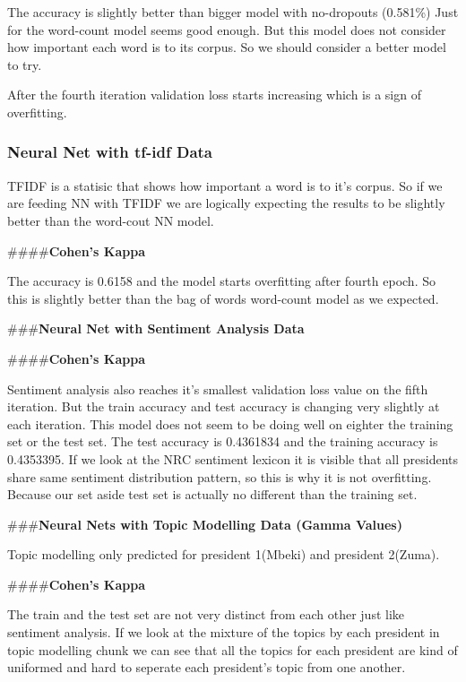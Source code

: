 \documentclass[]{article}
\begin{document}
The accuracy is slightly better than bigger model with no-dropouts
(0.581\%) Just for the word-count model seems good enough. But this
model does not consider how important each word is to its corpus. So we
should consider a better model to try.

After the fourth iteration validation loss starts increasing which is a
sign of overfitting.

\hypertarget{neural-net-with-tf-idf-data}{%
\subsubsection{\texorpdfstring{\textbf{Neural Net with tf-idf
Data}}{Neural Net with tf-idf Data}}\label{neural-net-with-tf-idf-data}}

TFIDF is a statisic that shows how important a word is to it's corpus.
So if we are feeding NN with TFIDF we are logically expecting the
results to be slightly better than the word-cout NN model.

\#\#\#\#\textbf{Cohen's Kappa}

The accuracy is 0.6158 and the model starts overfitting after fourth
epoch. So this is slightly better than the bag of words word-count model
as we expected.

\#\#\#\textbf{Neural Net with Sentiment Analysis Data}

\#\#\#\#\textbf{Cohen's Kappa}

Sentiment analysis also reaches it's smallest validation loss value on
the fifth iteration. But the train accuracy and test accuracy is
changing very slightly at each iteration. This model does not seem to be
doing well on eighter the training set or the test set. The test
accuracy is 0.4361834 and the training accuracy is 0.4353395. If we look
at the NRC sentiment lexicon it is visible that all presidents share
same sentiment distribution pattern, so this is why it is not
overfitting. Because our set aside test set is actually no different
than the training set.

\#\#\#\textbf{Neural Nets with Topic Modelling Data (Gamma Values)}

Topic modelling only predicted for president 1(Mbeki) and president
2(Zuma).

\#\#\#\#\textbf{Cohen's Kappa}

The train and the test set are not very distinct from each other just
like sentiment analysis. If we look at the mixture of the topics by each
president in topic modelling chunk we can see that all the topics for
each president are kind of uniformed and hard to seperate each
president's topic from one another.
\end{document}
